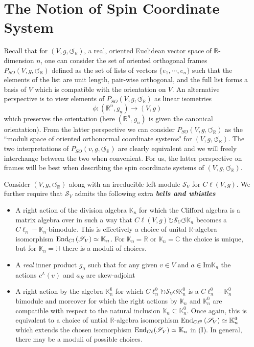 \documentclass[openany, 11pt]{article}
\theoremstyle{definition}
\theoremstyle{remark}
\def\lp{\ensuremath{\left(}}
\def\rp{\ensuremath{\right)}}
\def\Sc{\ensuremath{\mathscr{S}}}
\def\cal{\ensuremath{\boldsymbol{\circlearrowleft}}}
\def\bC{\ensuremath{\mathbb{C}}}
\def\bH{\ensuremath{\mathbb{H}}}
\def\bR{\ensuremath{\mathbb{R}}}
\def\bK{\ensuremath{\mathbb{K}}}
\def\End{\ensuremath{\textnormal{End}}}
\begin{document}
\section{The Notion of Spin Coordinate System}
Recall that for $(V,g,\cal_{\bR})$, a real, oriented Euclidean vector space of $\bR$-dimension $n$, one can consider the set of oriented orthogonal frames $P_{SO}(V,g,\cal_{\bR})$ defined as the set of lists of vectors $\{ e_1,\cdots,e_n\}$ such that the elements of the list are unit length, pair-wise orthogonal, and the full list forms a basis of $V$ which is compatible with the orientation on $V$. An alternative perspective is to view elements of $P_{SO}(V,g,\cal_{\bR})$ as linear isometries 
\[
    \phi:(\bR^n,g_n)\rightarrow (V,g)
\]
which preserves the orientation (here $(\bR^n,g_n)$ is given the canonical orientation). From the latter perspective we can consider $P_{SO}(V,g,\cal_{\bR})$ as the ``moduli space of oriented orthonormal coordinate systems" for $(V,g,\cal_{\bR})$. The two interpretations of $P_{SO}(v,g,\cal_{\bR})$ are clearly equivalent and we will freely interchange between the two when convenient. For us, the latter perspective on frames will be best when describing the spin coordinate systems of $(V,g,\cal_{\bR})$.\par
Consider $(V,g,\cal_{\bR})$ along with an irreducible left module $\Sc_V$ for $C\ell(V,g)$. We further require that $\Sc_V$ admits the following extra \textbf{\emph{bells and whistles}}
\begin{itemize}
    \item[(I)] A right action of the division algebra $\bK_n$ for which the Clifford algebra is a matrix algebra over in such a way that $C\ell(V,g)\circlearrowright\Sc_V\circlearrowleft\bK_n$ becomes a $C\ell_n-\bK_n$-bimodule. This is effectively a choice of unital $\bR$-algebra isomorphism $\End_{Cl}\lp\Sc_V\rp\simeq \bK_n$. For $\bK_n=\bR$ or $\bK_n=\bC$ the choice is unique, but for $\bK_n=\bH$ there is a moduli of choices.
    \item[(II)] A \emph{real} inner product $g_{\Sc}$ such that for any given $v\in V$ and $a\in \text{Im}\bK_n$ the actions $c^L(v)$ and $a_R$ are skew-adjoint
    \item[(III)] A right action by the algebra $\bK^0_n$ for which $C\ell^0_n\circlearrowright\Sc_V\circlearrowleft\bK^0_n$ is a $C\ell^0_n-\bK^0_n$ bimodule and moreover for which the right actions by $\bK_{n}$ and $\bK^0_n$ are compatible with respect to the natural inclusion $\bK_n\subseteq\bK^0_n$. Once again, this is equivalent to a choice of untial $\bR$-algebra isomorphism $\End_{C\ell^0}\lp\Sc_V\rp\simeq \bK^0_n$ which extends the chosen isomorphism $\End_{C\ell}(\Sc_V)\simeq\bK_n$ in (I). In general, there may be a moduli of possible choices.
\end{itemize}
\end{document}
